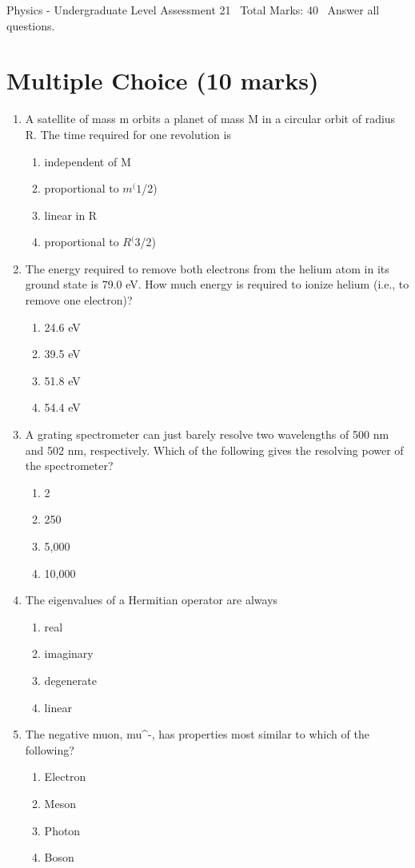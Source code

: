 \documentclass[12pt]{article}
\begin{document}
\begin{center}
Physics - Undergraduate Level Assessment 21 \
Total Marks: 40 \
Answer all questions.
\end{center}

\section*{Multiple Choice (10 marks)}
\begin{enumerate}[label=\arabic*.]
\item A satellite of mass m orbits a planet of mass M in a circular orbit of radius R. The time required for one revolution is
\begin{enumerate}[label=(\alph*)]
    \item independent of M
    \item proportional to $m^(1$/2)
    \item linear in R
    \item proportional to $R^(3$/2)
\end{enumerate}
\item The energy required to remove both electrons from the helium atom in its ground state is 79.0 eV. How much energy is required to ionize helium (i.e., to remove one electron)?
\begin{enumerate}[label=(\alph*)]
    \item 24.6 eV
    \item 39.5 eV
    \item 51.8 eV
    \item 54.4 eV
\end{enumerate}
\item A grating spectrometer can just barely resolve two wavelengths of 500 nm and 502 nm, respectively. Which of the following gives the resolving power of the spectrometer?
\begin{enumerate}[label=(\alph*)]
    \item 2
    \item 250
    \item 5,000
    \item 10,000
\end{enumerate}
\item The eigenvalues of a Hermitian operator are always
\begin{enumerate}[label=(\alph*)]
    \item real
    \item imaginary
    \item degenerate
    \item linear
\end{enumerate}
\item The negative muon, mu^-, has properties most similar to which of the following?
\begin{enumerate}[label=(\alph*)]
    \item Electron
    \item Meson
    \item Photon
    \item Boson
\end{enumerate}
\end{enumerate}
\end{document}
